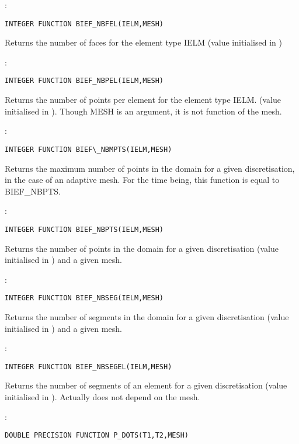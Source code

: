 :
\begin{lstlisting}[language=TelFortran]
INTEGER FUNCTION BIEF_NBFEL(IELM,MESH)
\end{lstlisting}

Returns the number of faces for the element type IELM (value initialised in
)

:
\begin{lstlisting}[language=TelFortran]
INTEGER FUNCTION BIEF_NBPEL(IELM,MESH)
\end{lstlisting}

Returns the number of points per element for the element type IELM. (value
initialised in ). Though MESH is an argument, it is not function
of the mesh.

:
\begin{lstlisting}[language=TelFortran]
INTEGER FUNCTION BIEF\_NBMPTS(IELM,MESH)
\end{lstlisting}

Returns the maximum number of points in the domain for a given discretisation,
in the case of an adaptive mesh. For the time being, this function is equal to
BIEF\_NBPTS.

:
\begin{lstlisting}[language=TelFortran]
INTEGER FUNCTION BIEF_NBPTS(IELM,MESH)
\end{lstlisting}

Returns the number of points in the domain for a given discretisation (value
initialised in ) and a given mesh.

:
\begin{lstlisting}[language=TelFortran]
INTEGER FUNCTION BIEF_NBSEG(IELM,MESH)
\end{lstlisting}

Returns the number of segments in the domain for a given discretisation (value
initialised in ) and a given mesh.

:
\begin{lstlisting}[language=TelFortran]
INTEGER FUNCTION BIEF_NBSEGEL(IELM,MESH)
\end{lstlisting}

Returns the number of segments of an element for a given discretisation (value
initialised in ). Actually does not depend on the mesh.

:
\begin{lstlisting}[language=TelFortran]
DOUBLE PRECISION FUNCTION P_DOTS(T1,T2,MESH)
\end{lstlisting}

